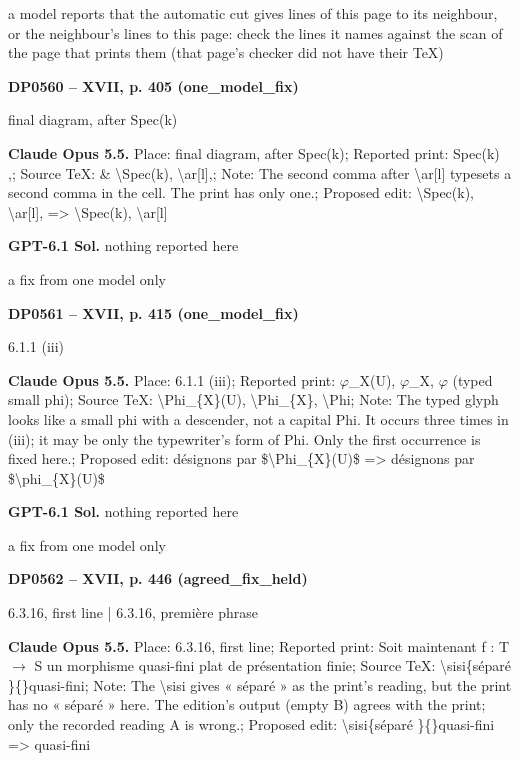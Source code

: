 a model reports that the automatic cut gives lines of this page to its neighbour, or the neighbour's lines to this page: check the lines it names against the scan of the page that prints them (that page's checker did not have their TeX)\par
\par\noindent\hypertarget{DP0560}{}\textbf{DP0560 -- XVII, p. 405 (one\_model\_fix)}\par
final diagram, after Spec(k)\par
\textbf{Claude Opus 5.5.} Place: final diagram, after Spec(k); Reported print: Spec(k)   ,; Source TeX: \& \textbackslash{}Spec(k), \textbackslash{}ar[l],; Note: The second comma after \textbackslash{}ar[l] typesets a second comma in the cell. The print has only one.; Proposed edit: \textbackslash{}Spec(k), \textbackslash{}ar[l], =\allowbreak > \textbackslash{}Spec(k), \textbackslash{}ar[l]\par
\textbf{GPT-6.1 Sol.} nothing reported here\par
a fix from one model only\par
\par\noindent\hypertarget{DP0561}{}\textbf{DP0561 -- XVII, p. 415 (one\_model\_fix)}\par
6.1.1 (iii)\par
\textbf{Claude Opus 5.5.} Place: 6.1.1 (iii); Reported print: \ensuremath{\varphi}\_X(U), \ensuremath{\varphi}\_X, \ensuremath{\varphi} (typed small phi); Source TeX: \textbackslash{}Phi\_\{X\}(U), \textbackslash{}Phi\_\{X\}, \textbackslash{}Phi; Note: The typed glyph looks like a small phi with a descender, not a capital Phi. It occurs three times in (iii); it may be only the typewriter's form of Phi. Only the first occurrence is fixed here.; Proposed edit: désignons par \$\textbackslash{}Phi\_\{X\}(U)\$ =\allowbreak > désignons par \$\textbackslash{}phi\_\{X\}(U)\$\par
\textbf{GPT-6.1 Sol.} nothing reported here\par
a fix from one model only\par
\par\noindent\hypertarget{DP0562}{}\textbf{DP0562 -- XVII, p. 446 (agreed\_fix\_held)}\par
6.3.16, first line | 6.3.16, première phrase\par
\textbf{Claude Opus 5.5.} Place: 6.3.16, first line; Reported print: Soit maintenant f : T \ensuremath{\longrightarrow} S un morphisme quasi-fini plat de présentation finie; Source TeX: \textbackslash{}sisi\{séparé \}\{\}quasi-fini; Note: The \textbackslash{}sisi gives « séparé » as the print's reading, but the print has no « séparé » here. The edition's output (empty B) agrees with the print; only the recorded reading A is wrong.; Proposed edit: \textbackslash{}sisi\{séparé \}\{\}quasi-fini =\allowbreak > quasi-fini\par
